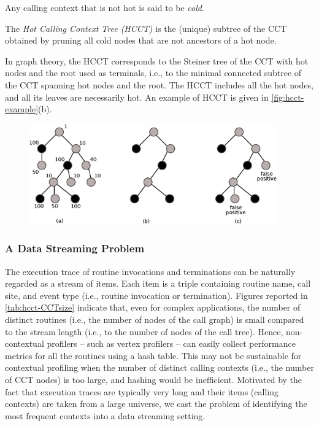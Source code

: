 \noindent Any calling context that is not hot is said to be {\em cold}. 

\begin{definition}
The {\em Hot Calling Context Tree (HCCT)} is the (unique) subtree of the CCT obtained by pruning all cold nodes that are not ancestors of a hot node.
\end{definition}

\noindent In graph theory, the HCCT corresponds to the Steiner tree of the CCT with hot nodes and the root used as terminals, i.e., to the minimal connected subtree of the CCT spanning hot nodes and the root. The HCCT includes all the hot nodes, and all its leaves are necessarily hot. An example of HCCT is given in \myfigure\ref{fig:hcct-example}(b). 

\ifdefined\noauthorea
\begin{figure}[ht]
\begin{center}
\includegraphics[width=0.95\textwidth]{figures/hcct-example/hcct-example.eps}
\caption{\protect}
\end{center}
\end{figure}
\fi

\subsubsection*{A Data Streaming Problem}
The execution trace of routine invocations and terminations can be naturally regarded as a stream of items. Each item is a triple containing routine name, call site, and event type (i.e., routine invocation or termination). Figures reported in \mytable\ref{tab:hcct-CCTsize} indicate that, even for complex applications, the number of distinct routines (i.e., the number of nodes of the call graph) is small compared to the stream length (i.e., to the number of nodes of the call tree). Hence, non-contextual profilers -- such as vertex profilers -- can easily collect performance metrics for all the routines using a hash table. This may not be sustainable
for contextual profiling when the number of distinct calling contexts (i.e., the number of CCT nodes) is too large, and hashing would be inefficient. Motivated by the fact that execution traces are typically very long and their items (calling contexts) are taken from a large universe, we cast the problem of identifying the most frequent contexts into a data streaming setting.

